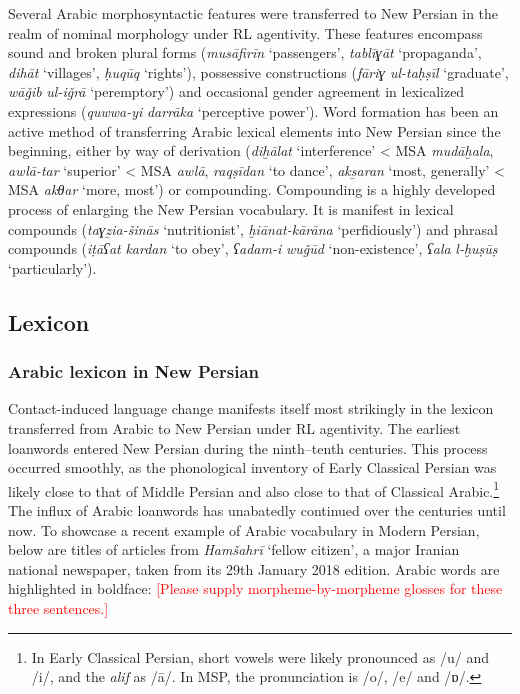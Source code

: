 \documentclass[output=paper]{langsci/langscibook}
\begin{document}
Several Arabic morphosyntactic features were transferred to New Persian in the realm of nominal morphology under RL agentivity. These features encompass sound and broken plural forms (\textit{musāfirīn} ‘passengers’, \textit{tablīɣāt} ‘propaganda’, \textit{dihāt} ‘villages’, \textit{ḥuqūq} ‘rights’), possessive constructions (\textit{fāriɣ} \textit{ul-taḥṣīl} ‘graduate’, \textit{wāǧib} \textit{ul-iǧrā} ‘peremptory’) and occasional gender agreement in lexicalized expressions (\textit{quwwa-yi} \textit{darrāka} ‘perceptive power’). Word formation has been an active method of transferring Arabic lexical elements into New Persian since the beginning, either by way of derivation (\textit{diḫālat} ‘interference’ < MSA \textit{mudāḫala}, \textit{awlā-tar} ‘superior’ < MSA \textit{awlā}, \textit{raqṣīdan} ‘to dance’, \textit{aks̱aran} ‘most, generally’ < MSA \textit{akθar} ‘more, most’) or compounding. Compounding is a highly developed process of enlarging the New Persian vocabulary. It is manifest in lexical compounds (\textit{taɣẕia-šinās} ‘nutritionist’, \textit{ḫiānat-kārāna} ‘perfidiously’) and phrasal compounds (\textit{iṭāʕat} \textit{kardan} ‘to obey’, \textit{ʕadam-i} \textit{wuǧūd} ‘non-existence’, \textit{ʕala} \textit{l-ḫuṣūṣ} ‘particularly’).

\subsection{Lexicon}

\subsubsection{Arabic lexicon in New Persian}

Contact-induced language change manifests itself most strikingly in the lexicon transferred from Arabic to New Persian under RL agentivity. The earliest loanwords entered New Persian during the ninth–tenth centuries. This process occurred smoothly, as the phonological inventory of Early Classical Persian was likely close to that of Middle Persian and also close to that of Classical Arabic.\footnote{In Early Classical Persian, short vowels were likely pronounced as /u/ and /i/, and the \textit{alif} as /ā/. In MSP, the pronunciation is /o/, /e/ and /ɒ/.} The influx of Arabic loanwords has unabatedly continued over the centuries until now. To showcase a recent example of Arabic vocabulary in Modern Persian, below are titles of articles from \textit{Hamšahrī} ‘fellow citizen’, a major Iranian national newspaper, taken from its 29th January 2018 edition. Arabic words are highlighted in boldface: \textcolor{red}{[Please supply morpheme-by-morpheme glosses for these three sentences.]}
\end{document}
